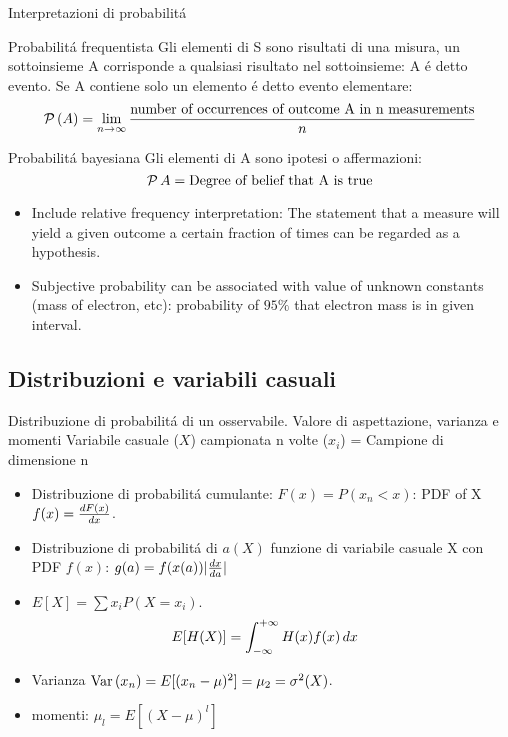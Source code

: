 \begin{frame}{Interpretazioni di probabilit\'a}
\begin{block}{Probabilit\'a frequentista}
Gli elementi di S sono risultati di una misura, un sottoinsieme A corrisponde a qualsiasi risultato nel sottoinsieme: A \'e detto evento. Se A contiene solo un elemento \'e detto evento elementare:
\begin{equation*}
\prob{(A)}=\lim_{n\to\infty}\frac{\text{number of occurrences of outcome A in n measurements}}{n}
\end{equation*}
\end{block}
\begin{block}{Probabilit\'a bayesiana }
Gli elementi di A sono ipotesi o affermazioni:
\begin{equation*}
\prob{A}=\text{Degree of belief that A is true}
\end{equation*}
\begin{itemize}
\item Include relative frequency interpretation: The statement that a measure will yield a given outcome a certain fraction of times can be regarded as a hypothesis.
\item Subjective probability can be associated with value of unknown constants (mass of electron, etc): probability of $95\%$ that electron mass is in given interval.
\end{itemize}
\end{block}
\end{frame}

\subsection{Distribuzioni e variabili casuali}

\begin{frame}{Distribuzione di probabilit\'a di un osservabile. Valore di aspettazione, varianza e momenti}
Variabile casuale ($X$) campionata n volte ($x_i$) = Campione di dimensione n
\begin{itemize}
\item Distribuzione di probabilit\'a cumulante: $F(x)=P(x_n<x)$: PDF of X $f(x)=\TDy{x}{F(x)}$.
\item Distribuzione di probabilit\'a di $a(X)$ funzione di variabile casuale X con PDF $f(x)$: $g(a)=f(x(a))|\TDy{a}{x}|$
\item $E[X]=\sum x_iP(X=x_i)$.
\begin{align*}
&E[H(X)]=\intsinf{}H(x)f(x)\,dx
\end{align*}
\item Varianza $\var{(x_n)}=E[(x_n-\mu)^2]=\mu_2=\sigma^2(X)$.
\item momenti: $\mu_l=E[(X-\mu)^l]$
\end{itemize}
\end{frame}

